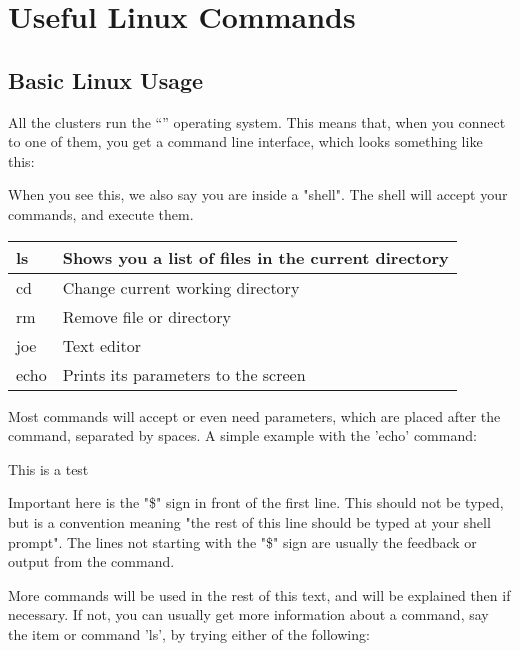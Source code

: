 \chapter{Useful Linux Commands}

\section{Basic Linux Usage}

All the \hpc clusters run the ``\operatingsystem'' operating system.  This
means that, when you connect to one of them, you get a command line interface,
which looks something like this:

\begin{prompt}
\end{prompt}

When you see this, we also say you are inside a "shell". The shell will accept
your commands, and execute them.

\begin{tabular}{|p{}|p{}|} \hline
ls   & Shows you a list of files in the current directory \\ \hline
cd   & Change current working directory \\ \hline
rm   & Remove file or directory \\ \hline
joe  & Text editor \\ \hline
echo & Prints its parameters to the screen \\ \hline
\end{tabular}

Most commands will accept or even need parameters, which are placed after the
command, separated by spaces. A simple example with the 'echo' command:

\begin{prompt}
This is a test
\end{prompt}

Important here is the "\$" sign in front of the first line. This should not be
typed, but is a convention meaning "the rest of this line should be typed at
your shell prompt". The lines not starting with the "\$" sign are usually the
feedback or output from the command.

More commands will be used in the rest of this text, and will be explained then
if necessary. If not, you can usually get more information about a command, say
the item or command 'ls', by trying either of the following:


